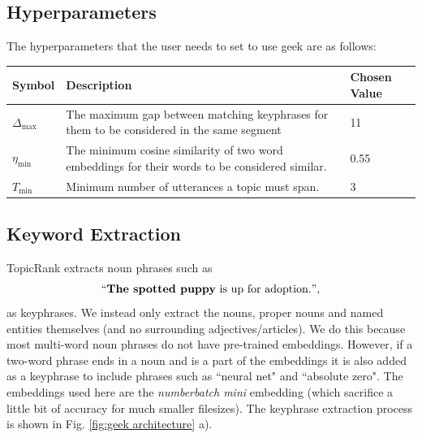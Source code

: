     \subsection{Hyperparameters}
    The hyperparameters that the user needs to set to use \gls{geek} are as follows:

    \begin{table}[H]
        \centering
        \begin{tabularx}{0.9\textwidth}{| t | L | t |}
        \hline
        \textbf{Symbol} & \textbf{Description} & \textbf{Chosen Value} \\ \hline
        $\Delta_{\text{max}}$     & The maximum gap between matching \glspl{keyphrase} for them to be considered in the same segment & 11                    \\ \hline
        $\eta_{\text{min}}$     & The minimum cosine similarity of two word \glspl{embedding} for their words to be considered similar. & 0.55                        \\ \hline
        $T_{\text{min}}$ & Minimum number of \glspl{utterance} a topic must span. & 3 \\ \hline

        \end{tabularx}
    \end{table}
    

    \subsection{Keyword Extraction}
        TopicRank extracts noun phrases such as
        \begin{equation*}
            ``\textbf{The spotted puppy}\text{ is up for adoption.}",
        \end{equation*}
        as \glspl{keyphrase}. We instead only extract the nouns, proper nouns and named entities themselves (and no surrounding adjectives/articles). We do this because most multi-word noun phrases do not have pre-trained \glspl{embedding}. However, if a two-word phrase ends in a noun and is a part of the \glspl{embedding} it is also added as a \gls{keyphrase} to include phrases such as ``neural net" and ``absolute zero". The \glspl{embedding} used here are the \textit{\gls{numberbatch} mini} \gls{embedding} (which sacrifice a little bit of accuracy for much smaller filesizes). The \gls{keyphrase} extraction process is shown in Fig. \ref{fig:geek architecture} a).

